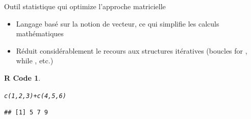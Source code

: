 \documentclass[11pt]{beamer}\usepackage[]{graphicx}\usepackage[]{color}
\makeatletter
\newcommand{\hlnum}[1]{\textcolor[rgb]{0.063,0.58,0.627}{#1}}%
\newcommand{\hlopt}[1]{\textcolor[rgb]{0.196,0.196,0.196}{#1}}%
\newcommand{\hlstd}[1]{\textcolor[rgb]{0.196,0.196,0.196}{#1}}%
\newcommand{\hlkwd}[1]{\textcolor[rgb]{0.78,0.227,0.412}{#1}}%
\newenvironment{kframe}{%
 \def\at@end@of@kframe{}%
 \ifinner\ifhmode%
  \def\at@end@of@kframe{\end{minipage}}%
  \begin{minipage}{\columnwidth}%
 \fi\fi%
 \def\FrameCommand##1{\hskip\@totalleftmargin \hskip-\fboxsep
 \colorbox{shadecolor}{##1}\hskip-\fboxsep
     \hskip-\linewidth \hskip-\@totalleftmargin \hskip\columnwidth}%
 \MakeFramed {\advance\hsize-\width
   \@totalleftmargin\z@ \linewidth\hsize
   \@setminipage}}%
 {\par\unskip\endMakeFramed%
 \at@end@of@kframe}
\newenvironment{knitrout}{}{} %
\newtheorem{rcode}{R Code}[section]
\makeatother
\begin{document}
\begin{frame}[fragile]{Outil statistique qui optimize l'approche matricielle}

\begin{itemize}
  \setlength\itemsep{2em}
\item Langage bas\'{e} sur la notion de vecteur, ce qui simplifie les calculs math\'{e}matiques 
\item R\'{e}duit consid\'{e}rablement le recours aux structures it\'{e}ratives
(boucles for , while , etc.)
\end{itemize}
\pause 
\begin{knitrout}
\color{fgcolor}\begin{kframe}
\begin{rcode}\label{unnamed-chunk-1}\hfill{}\begin{alltt}
\hlkwd{c}\hlstd{(}\hlnum{1}\hlstd{,}\hlnum{2}\hlstd{,}\hlnum{3}\hlstd{)} \hlopt{+} \hlkwd{c}\hlstd{(}\hlnum{4}\hlstd{,}\hlnum{5}\hlstd{,}\hlnum{6}\hlstd{)}
\end{alltt}
\begin{verbatim}
## [1] 5 7 9
\end{verbatim}
\end{rcode}\end{kframe}
\end{knitrout}


\end{frame}
\end{document}
